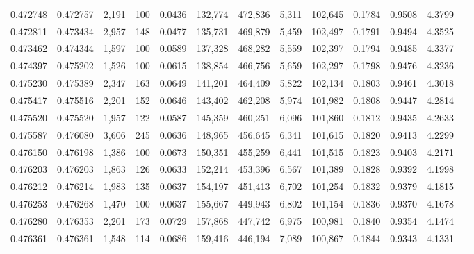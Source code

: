 \begin{tabular}{rrrrrrrrrrrrr}
0.472748 & 0.472757 & 2,191 &   100 &                                     0.0436 & 132,774 & 472,836 &   5,311 & 102,645 & 0.1784 & 0.9508 & 4.3799 \\
0.472811 & 0.473434 & 2,957 &   148 &                                     0.0477 & 135,731 & 469,879 &   5,459 & 102,497 & 0.1791 & 0.9494 & 4.3525 \\
0.473462 & 0.474344 & 1,597 &   100 &                                     0.0589 & 137,328 & 468,282 &   5,559 & 102,397 & 0.1794 & 0.9485 & 4.3377 \\
0.474397 & 0.475202 & 1,526 &   100 &                                     0.0615 & 138,854 & 466,756 &   5,659 & 102,297 & 0.1798 & 0.9476 & 4.3236 \\
0.475230 & 0.475389 & 2,347 &   163 &                                     0.0649 & 141,201 & 464,409 &   5,822 & 102,134 & 0.1803 & 0.9461 & 4.3018 \\
0.475417 & 0.475516 & 2,201 &   152 &                                     0.0646 & 143,402 & 462,208 &   5,974 & 101,982 & 0.1808 & 0.9447 & 4.2814 \\
0.475520 & 0.475520 & 1,957 &   122 &                                     0.0587 & 145,359 & 460,251 &   6,096 & 101,860 & 0.1812 & 0.9435 & 4.2633 \\
0.475587 & 0.476080 & 3,606 &   245 &                                     0.0636 & 148,965 & 456,645 &   6,341 & 101,615 & 0.1820 & 0.9413 & 4.2299 \\
0.476150 & 0.476198 & 1,386 &   100 &                                     0.0673 & 150,351 & 455,259 &   6,441 & 101,515 & 0.1823 & 0.9403 & 4.2171 \\
0.476203 & 0.476203 & 1,863 &   126 &                                     0.0633 & 152,214 & 453,396 &   6,567 & 101,389 & 0.1828 & 0.9392 & 4.1998 \\
0.476212 & 0.476214 & 1,983 &   135 &                                     0.0637 & 154,197 & 451,413 &   6,702 & 101,254 & 0.1832 & 0.9379 & 4.1815 \\
0.476253 & 0.476268 & 1,470 &   100 &                                     0.0637 & 155,667 & 449,943 &   6,802 & 101,154 & 0.1836 & 0.9370 & 4.1678 \\
0.476280 & 0.476353 & 2,201 &   173 &                                     0.0729 & 157,868 & 447,742 &   6,975 & 100,981 & 0.1840 & 0.9354 & 4.1474 \\
0.476361 & 0.476361 & 1,548 &   114 &                                     0.0686 & 159,416 & 446,194 &   7,089 & 100,867 & 0.1844 & 0.9343 & 4.1331 \\

\end{tabular}
